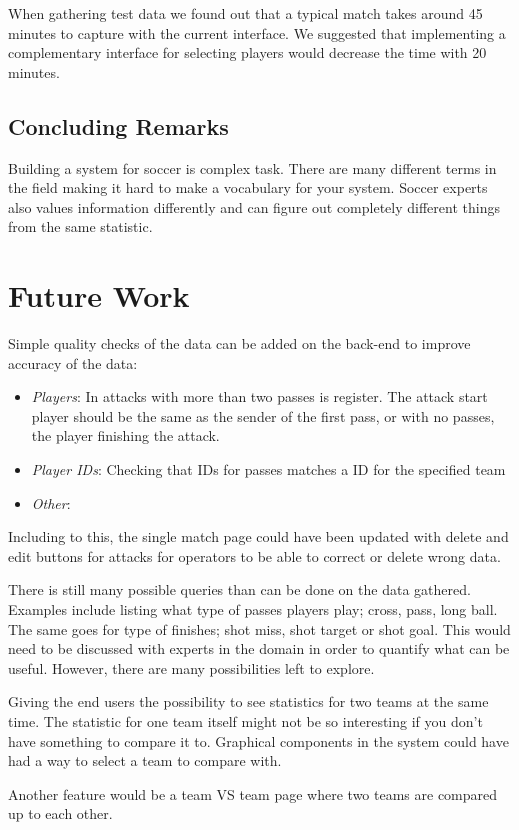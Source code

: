 When gathering test data we found out that a typical match takes around 45 minutes to capture with the current interface. We suggested that implementing a complementary interface for selecting players would decrease the time with 20 minutes.

\subsection{Concluding Remarks}

Building a system for soccer is complex task. There are many different terms in the field making it hard to make a vocabulary for your system. Soccer experts also values information differently and can figure out completely different things from the same statistic. 

\section{Future Work}

Simple quality checks of the data can be added on the back-end to improve accuracy of the data:

\begin{itemize}
\item \emph{Players}: In attacks with more than two passes is register. The attack start player should be the same as the sender of the first pass, or with no passes, the player finishing the attack. 
\item \emph{Player IDs}: Checking that IDs for passes matches a ID for the specified team
\item \emph{Other}: 
\end{itemize}

Including to this, the single match page could have been updated with delete and edit buttons for attacks for operators to be able to correct or delete wrong data.

There is still many possible queries than can be done on the data gathered. Examples include listing what type of passes players play; cross, pass, long ball. The same goes for type of finishes; shot miss, shot target or shot goal. This would need to be discussed with experts in the domain in order to quantify what can be useful. However, there are many possibilities left to explore. 

Giving the end users the possibility to see statistics for two teams at the same time. The statistic for one team itself might not be so interesting if you don't have something to compare it to. Graphical components in the system could have had a way to select a team to compare with.

Another feature would be a team VS team page where two teams are compared up to each other.





